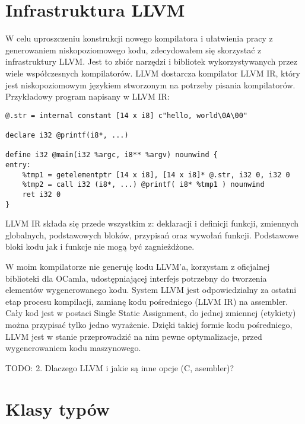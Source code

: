 \documentclass[declaration,shortabstract]{iithesis}
\begin{document}
\section{Infrastruktura LLVM}




W celu uproszczeniu konstrukcji nowego kompilatora i ułatwienia pracy z generowaniem 
niskopoziomowego kodu, zdecydowałem się skorzystać z infrastruktury LLVM. Jest to zbiór 
narzędzi i bibliotek wykorzystywanych przez wiele współczesnych kompilatorów. LLVM dostarcza 
kompilator LLVM IR, który jest niskopoziomowym językiem stworzonym na potrzeby pisania 
kompilatorów. Przykładowy program napisany w LLVM IR:

\begin{lstlisting}[frame=single]
@.str = internal constant [14 x i8] c"hello, world\0A\00"

declare i32 @printf(i8*, ...)

define i32 @main(i32 %argc, i8** %argv) nounwind {
entry:
    %tmp1 = getelementptr [14 x i8], [14 x i8]* @.str, i32 0, i32 0
    %tmp2 = call i32 (i8*, ...) @printf( i8* %tmp1 ) nounwind
    ret i32 0
}
\end{lstlisting}

LLVM IR składa się przede wszystkim z: deklaracji i definicji funkcji, zmiennych globalnych, 
podstawowych bloków, przypisań oraz wywołań funkcji. Podstawowe bloki kodu jak i funkcje nie 
mogą być zagnieżdżone. 

W moim kompilatorze nie generuję kodu LLVM'a, korzystam z oficjalnej biblioteki dla OCamla, 
udostępniającej interfejs potrzebny do tworzenia elementów wygenerowanego kodu. System LLVM 
jest odpowiedzialny za ostatni etap procesu kompilacji, zamianę kodu pośredniego (LLVM IR) na 
assembler. Cały kod jest w postaci Single Static Assignment, do jednej zmiennej (etykiety) 
można przypisać tylko jedno wyrażenie. Dzięki takiej formie kodu pośredniego, LLVM jest w 
stanie przeprowadzić na nim pewne optymalizacje, przed wygenerowaniem kodu maszynowego. 

TODO: 2. Dlaczego LLVM i jakie są inne opcje (C, asembler)? 

\section{Klasy typów}
\end{document}
